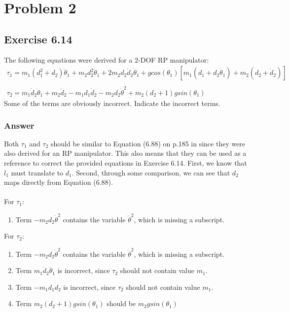 \documentclass[10pt]{article}
\begin{document}
\section*{Problem 2}
\subsection*{Exercise 6.14}
The following equations were derived for a 2-DOF RP manipulator:
\[
\begin{array}{l}
    \tau_{1} = m_{1}(d^{2}_{1} + d_{2})\ddot{\theta}_1 + 
				m_{2} d^{2}_{2}\ddot{\theta}_{1} + 
				2m_{2}d_{2}\dot{d}_{2}\dot{\theta}_{1} +
				g cos(\theta_{1})[m_{1}(d_{1} + d_{2}\dot{\theta}_{1}) + m_{2}(d_{2} + \dot{d}_{2})]\\ \\
    \tau_{2} = m_{1}\dot{d}_{2}\ddot{\theta}_{1} + m_{2}\ddot{d}_{2} - m_{1}d_{1}\dot{d}_2 - m_{2}d_{2}\dot{\theta}^2 + m_{2}(d_{2} + 1)g sin(\theta_{1})
\end{array}
\]
Some of the terms are obviously incorrect. Indicate the incorrect terms.
\subsubsection*{Answer}
Both \(\tau_{1}\) and \(\tau_{2}\) should be similar to Equation (6.88) on p.185 in \cite{textbook} since they were also derived for an RP manipulator. This also means that they can be used as a reference to correct the provided equations in Exercise 6.14. First, we know that \(l_{1}\) must translate to \(d_{1}\). Second, through some comparison, we can see that \(d_{2}\) maps directly from Equation (6.88). \\ \\
For \(\tau_{1}\):
\begin{enumerate}
\item Term \(- m_{2}d_{2}\dot{\theta}^2\) contains the variable \(\dot{\theta}^2\), which is missing a subscript.
\end{enumerate}
For \(\tau_{2}\):
\begin{enumerate}
\item Term \(- m_{2}d_{2}\dot{\theta}^2\) contains the variable \(\dot{\theta}^2\), which is missing a subscript.
\item Term \(m_{1}\dot{d}_{2}\ddot{\theta}_{1}\) is incorrect, since \(\tau_{2}\) should not contain value \(m_{1}\).
\item Term \(- m_{1}d_{1}\dot{d}_2\) is incorrect, since \(\tau_{2}\) should not contain value \(m_{1}\).
\item Term \(m_{2}(d_{2} + 1)g sin(\theta_{1})\) should be \(m_{2}g sin(\theta_{1})\)
\end{enumerate}
\pagebreak
\end{document}
